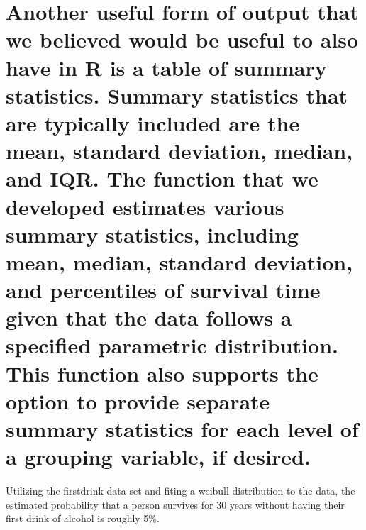 \hypertarget{another-useful-form-of-output-that-we-believed-would-be-useful-to-also-have-in-r-is-a-table-of-summary-statistics.-summary-statistics-that-are-typically-included-are-the-mean-standard-deviation-median-and-iqr.-the-function-that-we-developed-estimates-various-summary-statistics-including-mean-median-standard-deviation-and-percentiles-of-survival-time-given-that-the-data-follows-a-specified-parametric-distribution.-this-function-also-supports-the-option-to-provide-separate-summary-statistics-for-each-level-of-a-grouping-variable-if-desired.}{%
\section{\texorpdfstring{Another useful form of output that we believed
would be useful to also have in R is a table of summary statistics.
Summary statistics that are typically included are the mean, standard
deviation, median, and IQR. The  function that we
developed estimates various summary statistics, including mean, median,
standard deviation, and percentiles of survival time given that the data
follows a specified parametric distribution. This function also supports
the option to provide separate summary statistics for each level of a
grouping variable, if
desired.}{Another useful form of output that we believed would be useful to also have in R is a table of summary statistics. Summary statistics that are typically included are the mean, standard deviation, median, and IQR. The  function that we developed estimates various summary statistics, including mean, median, standard deviation, and percentiles of survival time given that the data follows a specified parametric distribution. This function also supports the option to provide separate summary statistics for each level of a grouping variable, if desired.}}\label{another-useful-form-of-output-that-we-believed-would-be-useful-to-also-have-in-r-is-a-table-of-summary-statistics.-summary-statistics-that-are-typically-included-are-the-mean-standard-deviation-median-and-iqr.-the-function-that-we-developed-estimates-various-summary-statistics-including-mean-median-standard-deviation-and-percentiles-of-survival-time-given-that-the-data-follows-a-specified-parametric-distribution.-this-function-also-supports-the-option-to-provide-separate-summary-statistics-for-each-level-of-a-grouping-variable-if-desired.}}

Utilizing the firstdrink data set and fiting a weibull distribution to
the data, the estimated probability that a person survives for 30 years
without having their first drink of alcohol is roughly 5\%.

